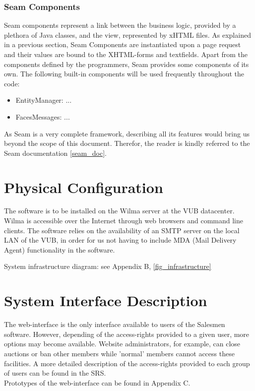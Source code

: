 \documentclass[salesmen, twoside]{../../../templates/latex/2009/softproj}
\begin{document}
\begin{projdoc}
\subsubsection{Seam Components}
\label{sec_seam_components}
Seam components represent a link between the business logic, provided by a plethora of Java classes, and the view, represented by xHTML files. As explained in a previous section, Seam Components are instantiated upon a page request and their values are bound to the XHTML-forms and textfields.  Apart from the components defined by the programmers, Seam provides some components of its own. The following built-in components will be used frequently throughout the code:
\begin{itemize}
\item EntityManager: ...
\item FacesMessages: ...
\end{itemize}

As Seam is a very complete framework, describing all its features would bring us beyond the scope of this document. Therefor, the reader is kindly referred to the Seam documentation \ref{seam_doc}.


\section{Physical Configuration}
The software is to be installed on the Wilma server at the VUB datacenter. Wilma is accessible over the Internet through web browsers and command line clients. The software relies on the availability of an SMTP server on the local LAN of the VUB, in order for us not having to include MDA (Mail Delivery Agent) functionality in the software.

System infrastructure diagram: see Appendix B, \ref{fig_infrastructure}


\section{System Interface Description}
The web-interface is the only interface available to users of the Salesmen software. However, depending of the access-rights provided to a given user, more options may become available. Website administrators, for example, can close auctions or ban other members while 'normal' members cannot access these facilities. A more detailed description of the access-rights provided to each group of users can be found in the SRS.\\
Prototypes of the web-interface can be found in Appendix C.



\end{projdoc}
\end{document}
